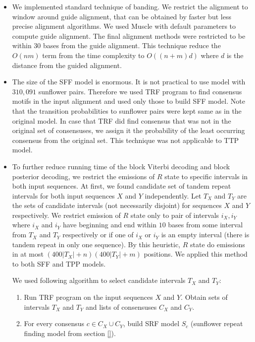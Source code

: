 \begin{itemize}[itemsep=-1mm]
\item We implemented standard technique of banding. We restrict the alignment
to window around guide alignment, that can be obtained by faster but less
precise alignment algorithms. We used Muscle\cite{Edgar2004} with default
parameters to compute guide alignment. The final alignment methods were
restricted to be within 30 bases from the guide alignment. This technique
reduce the $O(nm)$ term from the time complexity to $O((n+m)d)$ where $d$ is
the distance from the guided alignment.

\item The size of the SFF model is enormous. It is not practical to use model
with $310,091$ sunflower pairs. Therefore we used TRF program \cite{Benson1999}
to find consensus motifs in the input alignment and used only those to build
SFF model. Note that the transition probabilities to sunflower pairs were kept
same as in the original model. In case that TRF did find consensus that was not
in the original set of consensuses, we assign it the probability of the least
occurring consensus from the original set. This technique was not applicable to
TTP model.

\item To further reduce running time of the block Viterbi decoding and block
posterior decoding, we restrict the emissions of $R$ state to specific
intervals in both input sequences. At first, we found candidate set of tandem
repeat intervals for both input sequences $X$ and $Y$ independently. Let $T_X$ and $T_Y$ are
the sets of candidate intervals (not necessarily disjoint) for sequences $X$
and $Y$ respectively. We restrict emission of $R$ state only to pair of
intervals $i_X, i_Y$ where $i_X$ and $i_Y$ have beginning and end within $10$
bases from some interval from $T_X$ and $T_Y$ respectively or if one of $i_X$
or $i_Y$ is an empty interval (there is tandem repeat in only one sequence).
By this heuristic, $R$ state do emissions in at most $(400|T_X|+n)(400|T_Y|+m)$
positions. We applied this method to both SFF and TPP models.

We used following algorithm to select candidate intervals $T_X$ and $T_Y$:
\begin{enumerate}[itemsep=-1mm]
\item Run TRF program on the input sequences $X$ and $Y$. Obtain sets of
intervals $T_X$ and $T_Y$ and lists of consensuses $C_X$ and $C_Y$.

\item For every consensus $c\in C_X\cup C_Y$, build SRF model $S_c$ (sunflower
repeat finding model from section \ref{}). 


\end{enumerate}
\end{itemize}

